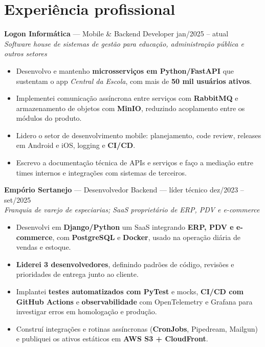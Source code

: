 \documentclass[10.5pt,a4paper]{article}
\newcommand{\cargo}[4]{%
  \Needspace*{5\baselineskip}%
  \textbf{#1} \textnormal{---} #2 \hfill \textnormal{#3}\\
  \textit{\small #4}\vspace{0.4ex}
}
\begin{document}
\section*{Experiência profissional}

\cargo{Logon Informática}{Mobile \& Backend Developer}{jan/2025 -- atual}{Software house de
sistemas de gestão para educação, administração pública e outros setores}
\begin{itemize}
  \item Desenvolvo e mantenho \textbf{microsserviços em Python/FastAPI} que sustentam o app
        \textit{Central da Escola}, com mais de \textbf{50 mil usuários ativos}.
  \item Implementei comunicação assíncrona entre serviços com \textbf{RabbitMQ} e armazenamento de
        objetos com \textbf{MinIO}, reduzindo acoplamento entre os módulos do produto.
  \item Lidero o setor de desenvolvimento mobile: planejamento, code review, releases em Android e
        iOS, logging e \textbf{CI/CD}.
  \item Escrevo a documentação técnica de APIs e serviços e faço a mediação entre times internos e
        integrações com sistemas de terceiros.
\end{itemize}

\cargo{Empório Sertanejo}{Desenvolvedor Backend --- líder técnico}{dez/2023 -- set/2025}{Franquia de
varejo de especiarias; SaaS proprietário de ERP, PDV e e-commerce}
\begin{itemize}
  \item Desenvolvi em \textbf{Django/Python} um SaaS integrando \textbf{ERP, PDV e e-commerce},
        com \textbf{PostgreSQL} e \textbf{Docker}, usado na operação diária de vendas e estoque.
  \item \textbf{Liderei 3 desenvolvedores}, definindo padrões de código, revisões e prioridades de
        entrega junto ao cliente.
  \item Implantei \textbf{testes automatizados com PyTest} e mocks, \textbf{CI/CD com GitHub
        Actions} e \textbf{observabilidade} com OpenTelemetry e Grafana para investigar erros em
        homologação e produção.
  \item Construí integrações e rotinas assíncronas (\textbf{CronJobs}, Pipedream, Mailgun) e
        publiquei os ativos estáticos em \textbf{AWS S3 + CloudFront}.
\end{itemize}
\end{document}
